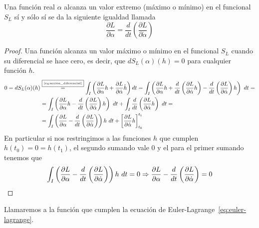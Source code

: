 \begin{theorem}
	Una función real $\alpha$ alcanza un valor extremo (máximo o mínimo) en el funcional $S_L$ sí y sólo sí se da la siguiente igualdad llamada 
	\begin{equation}
		\label{eq:euler-lagrange}
		\frac{\partial L}{\partial \alpha}=\frac{d}{dt}\left( \frac{\partial L}{\partial \dot{\alpha}} \right)
	\end{equation}
\end{theorem}
\begin{proof}
	Una función alcanza un valor máximo o mínimo en el funcional $S_L$ cuando su diferencial se hace cero, es decir, que $dS_L(\alpha)(h)=0$ para cualquier función $h$.
	\begin{equation*}
		\begin{split}
			0 = dS_L(\alpha)(h) &\overset{\fbox{\tiny \ref{eq:accion_diferencial}}}{=}\int_{I}\left( \frac{\partial L}{\partial\alpha}h+\frac{\partial L}{\partial\dot{\alpha}}\dot{h}\right) dt = \int_{I}\left( \frac{\partial L}{\partial\alpha}h+\frac{d}{dt}\left( \frac{\partial L}{\partial \dot{\alpha}}h \right)-\frac{d}{dt}\left( \frac{\partial L}{\partial \dot{\alpha}} \right)h\right)\ dt = \\
			& = \int_{I}\left( \frac{\partial L}{\partial \alpha}h-\frac{d}{dt}\left( \frac{\partial L}{\partial \dot{\alpha}} \right)h\right)\ dt +\int_{I}\frac{d}{dt}\left( \frac{\partial L}{\partial \dot{\alpha}}h \right)\ dt = \\
			& =\int_I\left( \frac{\partial L}{\partial \alpha}-\frac{d}{dt}\left( \frac{\partial L}{\partial \dot{\alpha}} \right)\right)h\ dt + \left[ \frac{\partial L}{\partial \dot{\alpha}}h \right]_{t_0}^{t_1}
		\end{split}
	\end{equation*}
	En particular si nos restringimos a las funciones $h$ que cumplen $h(t_0)=0=h(t_1)$, el segundo sumando vale $0$ y el para el primer sumando tenemos que
	\begin{equation*}
		\int_{I}\left( \frac{\partial L}{\partial \alpha}-\frac{d}{dt}\left( \frac{\partial L}{\partial \dot{\alpha}} \right)\right)h\ dt = 0 \Rightarrow \frac{\partial L}{\partial \alpha}-\frac{d}{dt}\left( \frac{\partial L}{\partial \dot{\alpha}} \right) = 0
	\end{equation*}
\end{proof}

\begin{definition}
	Llamaremos   a la función que cumplen la ecuación de Euler-Lagrange~\eqref{eq:euler-lagrange}.
\end{definition}

